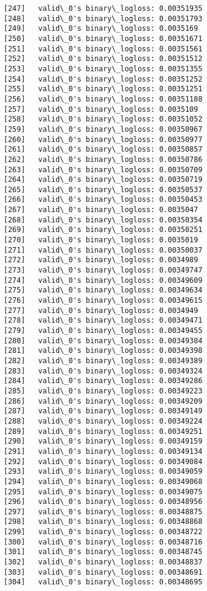 \documentclass[11pt]{article}
\begin{document}
\begin{Verbatim}[commandchars=\\\{\}]
[247]	valid\_0's binary\_logloss: 0.00351935
[248]	valid\_0's binary\_logloss: 0.00351793
[249]	valid\_0's binary\_logloss: 0.0035169
[250]	valid\_0's binary\_logloss: 0.00351671
[251]	valid\_0's binary\_logloss: 0.00351561
[252]	valid\_0's binary\_logloss: 0.00351512
[253]	valid\_0's binary\_logloss: 0.00351355
[254]	valid\_0's binary\_logloss: 0.00351252
[255]	valid\_0's binary\_logloss: 0.00351251
[256]	valid\_0's binary\_logloss: 0.00351188
[257]	valid\_0's binary\_logloss: 0.0035109
[258]	valid\_0's binary\_logloss: 0.00351052
[259]	valid\_0's binary\_logloss: 0.00350967
[260]	valid\_0's binary\_logloss: 0.00350977
[261]	valid\_0's binary\_logloss: 0.00350857
[262]	valid\_0's binary\_logloss: 0.00350786
[263]	valid\_0's binary\_logloss: 0.00350709
[264]	valid\_0's binary\_logloss: 0.00350719
[265]	valid\_0's binary\_logloss: 0.00350537
[266]	valid\_0's binary\_logloss: 0.00350453
[267]	valid\_0's binary\_logloss: 0.0035047
[268]	valid\_0's binary\_logloss: 0.00350354
[269]	valid\_0's binary\_logloss: 0.00350251
[270]	valid\_0's binary\_logloss: 0.0035019
[271]	valid\_0's binary\_logloss: 0.00350037
[272]	valid\_0's binary\_logloss: 0.0034989
[273]	valid\_0's binary\_logloss: 0.00349747
[274]	valid\_0's binary\_logloss: 0.00349609
[275]	valid\_0's binary\_logloss: 0.00349634
[276]	valid\_0's binary\_logloss: 0.00349615
[277]	valid\_0's binary\_logloss: 0.0034949
[278]	valid\_0's binary\_logloss: 0.00349471
[279]	valid\_0's binary\_logloss: 0.00349455
[280]	valid\_0's binary\_logloss: 0.00349384
[281]	valid\_0's binary\_logloss: 0.00349398
[282]	valid\_0's binary\_logloss: 0.00349389
[283]	valid\_0's binary\_logloss: 0.00349324
[284]	valid\_0's binary\_logloss: 0.00349286
[285]	valid\_0's binary\_logloss: 0.00349223
[286]	valid\_0's binary\_logloss: 0.00349209
[287]	valid\_0's binary\_logloss: 0.00349149
[288]	valid\_0's binary\_logloss: 0.00349224
[289]	valid\_0's binary\_logloss: 0.00349251
[290]	valid\_0's binary\_logloss: 0.00349159
[291]	valid\_0's binary\_logloss: 0.00349134
[292]	valid\_0's binary\_logloss: 0.00349084
[293]	valid\_0's binary\_logloss: 0.00349059
[294]	valid\_0's binary\_logloss: 0.00349068
[295]	valid\_0's binary\_logloss: 0.00349075
[296]	valid\_0's binary\_logloss: 0.00348956
[297]	valid\_0's binary\_logloss: 0.00348875
[298]	valid\_0's binary\_logloss: 0.00348868
[299]	valid\_0's binary\_logloss: 0.00348722
[300]	valid\_0's binary\_logloss: 0.00348716
[301]	valid\_0's binary\_logloss: 0.00348745
[302]	valid\_0's binary\_logloss: 0.00348837
[303]	valid\_0's binary\_logloss: 0.00348691
[304]	valid\_0's binary\_logloss: 0.00348695

\end{Verbatim}
\end{document}
